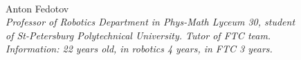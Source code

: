 \begin{figure}[H]
	\begin{minipage}[h]{0.47\linewidth}
		\\
	\end{minipage}
	\hfill
	\begin{minipage}{0.47\linewidth}
		Anton Fedotov \\ 
		\emph{Professor of Robotics Department in Phys-Math Lyceum 30, student of St-Petersburg Polytechnical University. Tutor of FTC team. \\}
		\emph{Information: 22 years old, in robotics 4 years, in FTC 3 years.}
	\end{minipage}	
	\vfill 
\end{figure}


